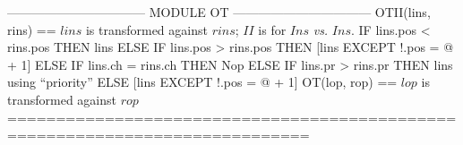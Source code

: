\documentclass{article}
\begin{document}
\begin{tla}
--------------------------------- MODULE OT ---------------------------------
OTII(lins, rins) == \* $lins$ is transformed against $rins$; $II$ is for $Ins$ \emph{vs.} $Ins$.
    IF lins.pos < rins.pos THEN lins
    ELSE IF lins.pos > rins.pos
         THEN [lins EXCEPT !.pos = @ + 1]
         ELSE IF lins.ch = rins.ch THEN Nop
              ELSE IF lins.pr > rins.pr THEN lins \* using ``priority''
                   ELSE [lins EXCEPT !.pos = @ + 1]
OT(lop, rop) == \* $lop$ is transformed against $rop$
=============================================================================
\end{tla}
\end{document}
